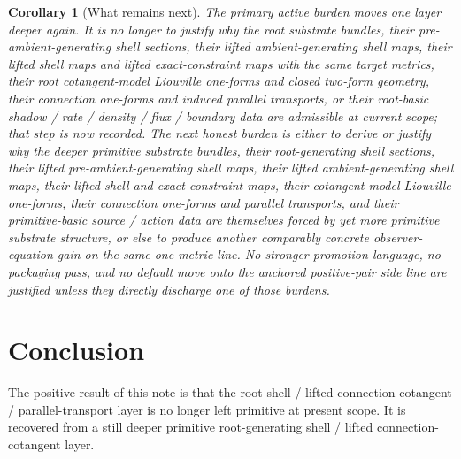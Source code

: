 \documentclass[11pt]{article}
\newtheorem{corollary}{Corollary}
\begin{document}
\begin{corollary}[What remains next]
\label{cor:what_next}
The primary active burden moves one layer deeper again. It is no longer to justify why the root substrate bundles, their pre-ambient-generating shell sections, their lifted ambient-generating shell maps, their lifted shell maps and lifted exact-constraint maps with the same target metrics, their root cotangent-model Liouville one-forms and closed two-form geometry, their connection one-forms and induced parallel transports, or their root-basic shadow / rate / density / flux / boundary data are admissible at current scope; that step is now recorded. The next honest burden is either to derive or justify why the deeper primitive substrate bundles, their root-generating shell sections, their lifted pre-ambient-generating shell maps, their lifted ambient-generating shell maps, their lifted shell and exact-constraint maps, their cotangent-model Liouville one-forms, their connection one-forms and parallel transports, and their primitive-basic source / action data are themselves forced by yet more primitive substrate structure, or else to produce another comparably concrete observer-equation gain on the same one-metric line. No stronger promotion language, no packaging pass, and no default move onto the anchored positive-pair side line are justified unless they directly discharge one of those burdens.
\end{corollary}

\section{Conclusion}

The positive result of this note is that the root-shell / lifted connection-cotangent / parallel-transport layer is no longer left primitive at present scope. It is recovered from a still deeper primitive root-generating shell / lifted connection-cotangent layer.
\end{document}
